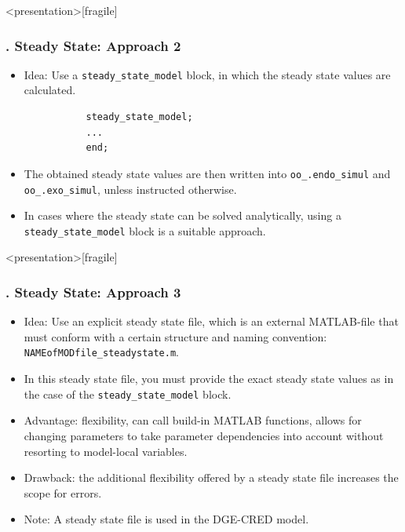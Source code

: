 \documentclass[11pt,aspectratio=169]{beamer}
\begin{document}
\begin{frame}<presentation>[fragile]
	\frametitle{{\thesection.\thesubsection} Steady State: Approach 2}
	\begin{itemize}
		\item Idea: Use a \texttt{steady\_state\_model} block, in which the steady state values are calculated. 
		\begin{verbatim}
		   steady_state_model;
		   ...
		   end;
		\end{verbatim}
		\item The obtained steady state values are then written into \texttt{oo\_.endo\_simul} and \texttt{oo\_.exo\_simul}, unless instructed otherwise. 
		\item In cases where the steady state can be solved analytically, using a \texttt{steady\_state\_model} block is a suitable approach. 
	\end{itemize}
\end{frame}
\begin{frame}<presentation>[fragile]
	\frametitle{{\thesection.\thesubsection} Steady State: Approach 3}
	\begin{itemize}
		\justifying
		\item  Idea: Use an explicit steady state file, which is an external MATLAB-file that must conform with a certain structure and naming convention:\\ \texttt{NAMEofMODfile\_steadystate.m}. 
		\item In this steady state file, you must provide the exact steady state values as in the case of the \texttt{steady\_state\_model} block.
		\item Advantage: flexibility, can call build-in MATLAB functions, allows for changing parameters to take parameter dependencies into account without resorting to model-local variables.
		\item Drawback: the additional flexibility offered by a steady state file increases the scope for errors.
		\item Note: A steady state file is used in the DGE-CRED model.
	\end{itemize}
\end{frame}
\end{document}
